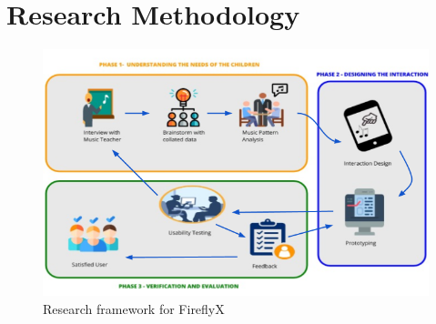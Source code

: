 %
%
%                 

\chapter{Research Methodology}



\begin{figure}[H]
    \centering
    \includegraphics[width=16cm]{figures/Diagram1.png}
    \caption{Research framework for FireflyX}
    \label{fig:FireflyX}
\end{figure}

